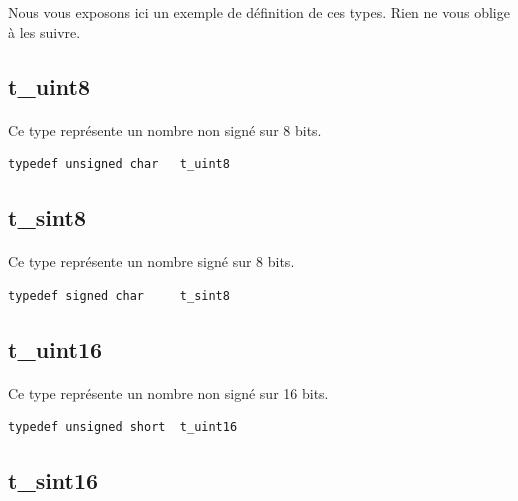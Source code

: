 \documentclass[10pt,a4wide]{article}
\begin{document}
Nous vous exposons ici un exemple de d\'efinition de ces types. Rien ne vous
oblige \`a les suivre.

\subsection{t\_uint8}

\paragraph{}

Ce type repr\'esente un nombre non sign\'e sur 8 bits.

\begin{verbatim}
typedef unsigned char   t_uint8
\end{verbatim}

\subsection{t\_sint8}

\paragraph{}

Ce type repr\'esente un nombre sign\'e sur 8 bits.

\begin{verbatim}
typedef signed char     t_sint8
\end{verbatim}

\subsection{t\_uint16}

\paragraph{}

Ce type repr\'esente un nombre non sign\'e sur 16 bits.

\begin{verbatim}
typedef unsigned short  t_uint16
\end{verbatim}

\subsection{t\_sint16}

\paragraph{}
\end{document}
